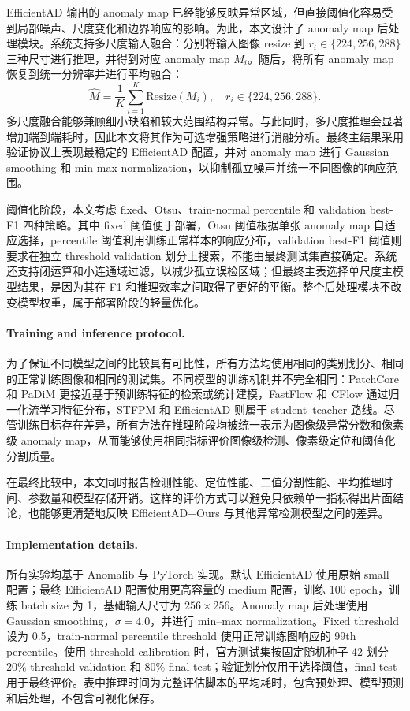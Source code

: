 \documentclass[letterpaper]{article}
\newcommand{\method}{EfficientAD+Ours}
\begin{document}
EfficientAD 输出的 anomaly map 已经能够反映异常区域，但直接阈值化容易受到局部噪声、尺度变化和边界响应的影响。为此，本文设计了 anomaly map 后处理模块。系统支持多尺度输入融合：分别将输入图像 resize 到 \(r_i\in\{224,256,288\}\) 三种尺寸进行推理，并得到对应 anomaly map \(M_i\)。随后，将所有 anomaly map 恢复到统一分辨率并进行平均融合：
\[
\hat{M}=\frac{1}{K}\sum_{i=1}^{K}\mathrm{Resize}(M_i), \quad r_i\in\{224,256,288\}.
\]
多尺度融合能够兼顾细小缺陷和较大范围结构异常。与此同时，多尺度推理会显著增加端到端耗时，因此本文将其作为可选增强策略进行消融分析。最终主结果采用验证协议上表现最稳定的 EfficientAD 配置，并对 anomaly map 进行 Gaussian smoothing 和 min-max normalization，以抑制孤立噪声并统一不同图像的响应范围。

阈值化阶段，本文考虑 fixed、Otsu、train-normal percentile 和 validation best-F1 四种策略。其中 fixed 阈值便于部署，Otsu 阈值根据单张 anomaly map 自适应选择，percentile 阈值利用训练正常样本的响应分布，validation best-F1 阈值则要求在独立 threshold validation 划分上搜索，不能由最终测试集直接确定。系统还支持闭运算和小连通域过滤，以减少孤立误检区域；但最终主表选择单尺度主模型结果，是因为其在 F1 和推理效率之间取得了更好的平衡。整个后处理模块不改变模型权重，属于部署阶段的轻量优化。

\paragraph{Training and inference protocol.}

为了保证不同模型之间的比较具有可比性，所有方法均使用相同的类别划分、相同的正常训练图像和相同的测试集。不同模型的训练机制并不完全相同：PatchCore 和 PaDiM 更接近基于预训练特征的检索或统计建模，FastFlow 和 CFlow 通过归一化流学习特征分布，STFPM 和 EfficientAD 则属于 student--teacher 路线。尽管训练目标存在差异，所有方法在推理阶段均被统一表示为图像级异常分数和像素级 anomaly map，从而能够使用相同指标评价图像级检测、像素级定位和阈值化分割质量。

在最终比较中，本文同时报告检测性能、定位性能、二值分割性能、平均推理时间、参数量和模型存储开销。这样的评价方式可以避免只依赖单一指标得出片面结论，也能够更清楚地反映 \method{} 与其他异常检测模型之间的差异。

\paragraph{Implementation details.}

所有实验均基于 Anomalib 与 PyTorch 实现。默认 EfficientAD 使用原始 small 配置；最终 EfficientAD 配置使用更高容量的 medium 配置，训练 100 epoch，训练 batch size 为 1，基础输入尺寸为 \(256\times256\)。Anomaly map 后处理使用 Gaussian smoothing，\(\sigma=4.0\)，并进行 min--max normalization。Fixed threshold 设为 0.5，train-normal percentile threshold 使用正常训练图响应的 99th percentile。使用 threshold calibration 时，官方测试集按固定随机种子 42 划分 20\% threshold validation 和 80\% final test；验证划分仅用于选择阈值，final test 用于最终评价。表中推理时间为完整评估脚本的平均耗时，包含预处理、模型预测和后处理，不包含可视化保存。
\end{document}
